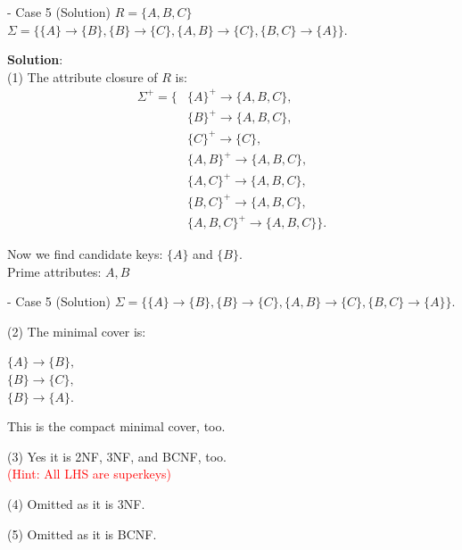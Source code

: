 \begin{frame}[fragile]{ - Case 5 (Solution)}
	$R=\{A, B, C\}$\\ 
	$\Sigma=\{\{A\} \rightarrow \{B\},\{B\} \rightarrow \{C\}, \{A, B\} \rightarrow \{C\},\{B, C\} \rightarrow \{A\}\}.$\\\vspace{5pt}
	
	\textbf{Solution}:\\
	(1) The attribute closure of $R$ is:
	\begin{align*} 
		\Sigma^{+} = \{&\{A\}^{+} \rightarrow \{A,B,C\},\\
		&\{B\}^{+} \rightarrow \{A,B,C\},\\
		&\{C\}^{+} \rightarrow \{C\},\\
		&\{A,B\}^{+} \rightarrow \{A,B,C\},\\
		&\{A,C\}^{+} \rightarrow \{A,B,C\},\\
		&\{B,C\}^{+} \rightarrow \{A,B,C\},\\
		&\{A,B,C\}^{+} \rightarrow \{A,B,C\}\}.
	\end{align*} 
	
	Now we find candidate keys: $\{A\}$ and $\{B\}$.\\
	Prime attributes: $A, B$
\end{frame}

\begin{frame}[fragile]{ - Case 5 (Solution)}
	$\Sigma=\{\{A\} \rightarrow \{B\},\{B\} \rightarrow \{C\}, \{A, B\} \rightarrow \{C\},\{B, C\} \rightarrow \{A\}\}.$\\\vspace{25pt}
	
	(2) The minimal cover is:\\\vspace{5pt}
	
	$\{A\} \rightarrow \{B\},$\\
	$\{B\}  \rightarrow \{C\},$\\
	$\{B\} \rightarrow \{A\}.$\\\vspace{5pt}
	
	This is the compact minimal cover, too.\\\vspace{5pt}
	
	(3)  Yes it is 2NF, 3NF, and BCNF, too.\\\vspace{2pt}
	\textcolor{red}{(Hint: All LHS are superkeys)}\\\vspace{5pt}
	
	(4) Omitted as it is 3NF. \\\vspace{5pt}
	
	(5) Omitted as it is BCNF. \\\vspace{5pt}
	
\end{frame}

